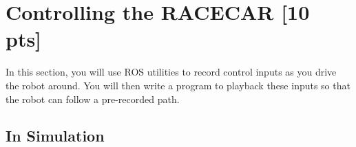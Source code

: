 \documentclass[final]{article}
\begin{document}

\section{Controlling the RACECAR [10 pts]} 
In this section, you will use ROS utilities to record control inputs as you drive the robot around. You will then write a program to playback these inputs so that the robot can follow a pre-recorded path. 

\subsection{In Simulation}
\end{document}
